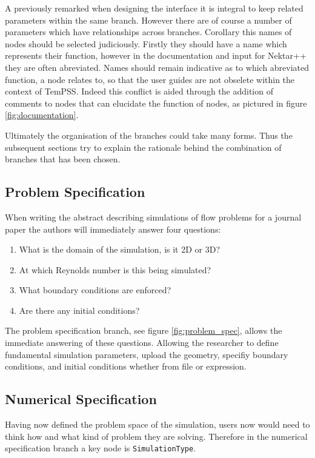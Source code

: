 \documentclass[11pt, a4paper]{report}
\begin{document}
A previously remarked when designing the interface it is integral to keep related parameters within the same branch. However there are of course a number of parameters which have relationships across branches. Corollary this names of nodes should be selected judiciously. Firstly they should have a name which represents their function, however in the documentation and input for Nektar++ they are often abreviated. Names should remain indicative as to which abreviated function, a node relates to, so that the user guides are not obselete within the context of TemPSS. Indeed this conflict is aided through the addition of comments to nodes that can elucidate the function of nodes, as pictured in figure \ref{fig:documentation}.

Ultimately the organisation of the branches could take many forms. Thus the subsequent sections try to explain the rationale behind the combination of branches that has been chosen.

\subsection{Problem Specification}
When writing the abstract describing simulations of flow problems for a journal paper the authors will immediately answer four questions:
\begin{enumerate}
\item What is the domain of the simulation, is it 2D or 3D?
\item At which Reynolds number is this being simulated?
\item What boundary conditions are enforced?
\item Are there any initial conditions?
\end{enumerate}

The problem specification branch, see figure \ref{fig:problem_spec}, allows the immediate answering of these questions. Allowing the researcher to define fundamental simulation parameters, upload the geometry, specifiy boundary conditions, and initial conditions whether from file or expression.	

\subsection{Numerical Specification}
Having now defined the problem space of the simulation, users now would need to think how and what kind of problem they are solving. Therefore in the numerical specification branch a key node is \texttt{SimulationType}.
\end{document}
